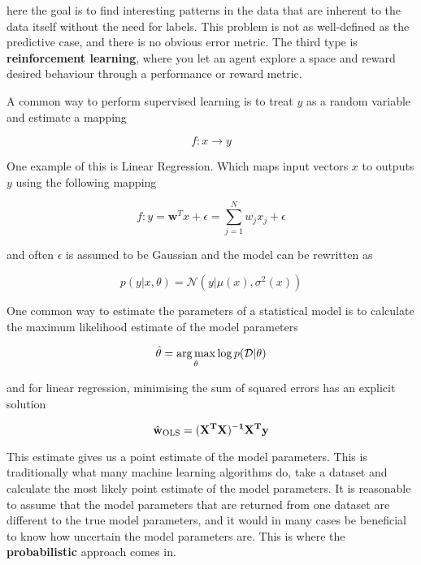 here the goal is to find interesting patterns in the data that are inherent to the data itself without the need for labels. This problem is not as well-defined as the predictive case, and there is no obvious error metric. The third type is \textbf{reinforcement learning}, where you let an agent explore a space and reward desired behaviour through a performance or reward metric. 

A common way to perform supervised learning is to treat  $y$ as a random variable and estimate a mapping 

\begin{equation*}
    f: x \rightarrow y
\end{equation*}

One example of this is Linear Regression. Which maps input vectors $x$ to outputs $y$ using the following mapping \cite[p.~19]{Murphy:2012:Book}

\begin{equation*}
    f: y = \mathbf{w}^Tx + \epsilon = \sum_{j=1}^N w_j x_j + \epsilon
\end{equation*}

and often $\epsilon$ is assumed to be Gaussian and the model can be rewritten as 

\begin{equation*}
    p(y|x, \theta) = \mathcal{N}(y|\mu(x), \sigma^2(x))
\end{equation*}

One common way to estimate the parameters of a statistical model is to calculate the maximum likelihood estimate of the model parameters \cite[p.~217]{Murphy:2012:Book}

\begin{equation*}
    \hat{\mathbf{\theta}} = \operatorname*{arg\,max}_{\theta} \log p(\mathcal{D}|\theta)
\end{equation*}

and for linear regression, minimising the sum of squared errors has an explicit solution \cite[p.~220]{Murphy:2012:Book}

\begin{equation*}
    \hat{\bf{w}}_{\text{OLS}} = (\bf{X}^T\bf{X})^{-1}\bf{X}^T\bf{y}
\end{equation*}

This estimate gives us a point estimate of the model parameters. This is traditionally what many machine learning algorithms do, take a dataset and calculate the most likely point estimate of the model parameters. It is reasonable to assume that the model parameters that are returned from one dataset are different to the true model parameters, and it would in many cases be beneficial to know how uncertain the model parameters are. This is where the \textbf{probabilistic} approach comes in.

